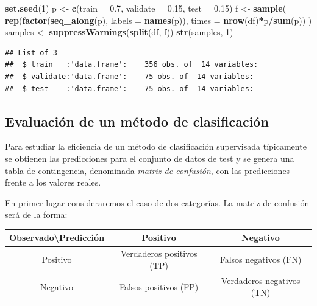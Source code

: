 \documentclass[
  spanish,
]{book}
\newenvironment{Shaded}{\begin{snugshade}}{\end{snugshade}}
\newcommand{\DataTypeTok}[1]{\textcolor[rgb]{0.13,0.29,0.53}{#1}}
\newcommand{\DecValTok}[1]{\textcolor[rgb]{0.00,0.00,0.81}{#1}}
\newcommand{\FloatTok}[1]{\textcolor[rgb]{0.00,0.00,0.81}{#1}}
\newcommand{\KeywordTok}[1]{\textcolor[rgb]{0.13,0.29,0.53}{\textbf{#1}}}
\newcommand{\NormalTok}[1]{#1}
\newcommand{\OperatorTok}[1]{\textcolor[rgb]{0.81,0.36,0.00}{\textbf{#1}}}
\newcommand{\StringTok}[1]{\textcolor[rgb]{0.31,0.60,0.02}{#1}}
\theoremstyle{break}
\theoremstyle{definition}
\theoremstyle{definition}
\theoremstyle{definition}
\theoremstyle{remark}
\begin{document}
\begin{Shaded}
\begin{Highlighting}[]
\KeywordTok{set.seed}\NormalTok{(}\DecValTok{1}\NormalTok{)}
\NormalTok{p <-}\StringTok{ }\KeywordTok{c}\NormalTok{(}\DataTypeTok{train =} \FloatTok{0.7}\NormalTok{, }\DataTypeTok{validate =} \FloatTok{0.15}\NormalTok{, }\DataTypeTok{test =} \FloatTok{0.15}\NormalTok{)}
\NormalTok{f <-}\StringTok{ }\KeywordTok{sample}\NormalTok{( }\KeywordTok{rep}\NormalTok{(}\KeywordTok{factor}\NormalTok{(}\KeywordTok{seq_along}\NormalTok{(p), }\DataTypeTok{labels =} \KeywordTok{names}\NormalTok{(p)),}
                 \DataTypeTok{times =} \KeywordTok{nrow}\NormalTok{(df)}\OperatorTok{*}\NormalTok{p}\OperatorTok{/}\KeywordTok{sum}\NormalTok{(p)) )}
\NormalTok{samples <-}\StringTok{ }\KeywordTok{suppressWarnings}\NormalTok{(}\KeywordTok{split}\NormalTok{(df, f))}
\KeywordTok{str}\NormalTok{(samples, }\DecValTok{1}\NormalTok{)}
\end{Highlighting}
\end{Shaded}

\begin{verbatim}
## List of 3
##  $ train   :'data.frame':    356 obs. of  14 variables:
##  $ validate:'data.frame':    75 obs. of  14 variables:
##  $ test    :'data.frame':    75 obs. of  14 variables:
\end{verbatim}

\hypertarget{eval-class}{%
\subsection{Evaluación de un método de clasificación}\label{eval-class}}

Para estudiar la eficiencia de un método de clasificación supervisada típicamente se obtienen las predicciones para el conjunto de datos de test y se genera una tabla de contingencia, denominada \emph{matriz de confusión}, con las predicciones frente a los valores reales.

En primer lugar consideraremos el caso de dos categorías.
La matriz de confusión será de la forma:

\begin{longtable}[]{@{}ccc@{}}
\toprule
Observado\textbackslash Predicción & Positivo & Negativo\tabularnewline
\midrule
\endhead
Positivo & Verdaderos positivos (TP) & Falsos negativos (FN)\tabularnewline
Negativo & Falsos positivos (FP) & Verdaderos negativos (TN)\tabularnewline
\bottomrule
\end{longtable}
\end{document}
